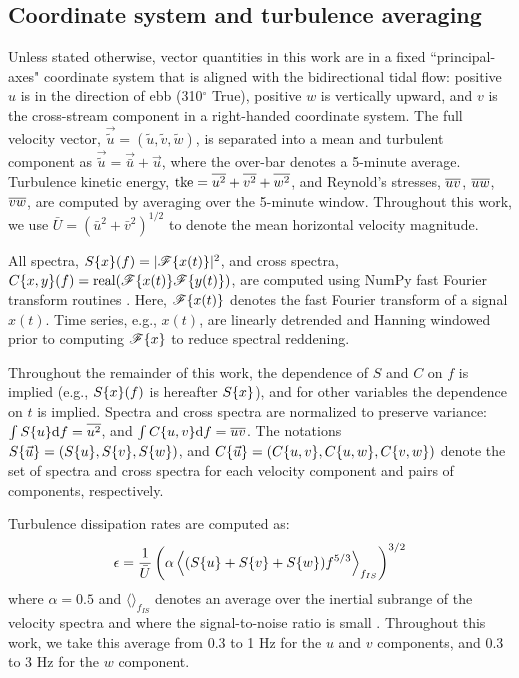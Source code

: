 \subsection{Coordinate system and turbulence averaging}

Unless stated otherwise, vector quantities in this work are in a fixed ``principal-axes" coordinate system that is aligned with the bidirectional tidal flow: positive $u$ is in the direction of ebb (310$^\circ$ True), positive $w$ is vertically upward, and $v$ is the cross-stream component in a right-handed coordinate system. The full velocity vector, $\vec{\tilde{u}} = (\tilde{u}, \tilde{v}, \tilde{w})$, is separated into a mean and turbulent component as $\vec{\tilde{u}} = \vec{\bar{u}} + \vec{u}$, where the over-bar denotes a 5-minute average. Turbulence kinetic energy, $\mathrm{tke} = \overline{u^2} + \overline{v^2}+\overline{w^2}$, and Reynold's stresses, $\overline{uv}$, $\overline{uw}$, $\overline{vw}$, are computed by averaging over the 5-minute window.  Throughout this work, we use $\bar{U} = (\bar{u}^2+\bar{v}^2)^{1/2}$ to denote the mean horizontal velocity magnitude. 

All spectra, $S\{x\}(f)=|\mathscr{F}\{x(t)\}|^2$, and cross spectra, $C\{x,y\}(f)=\mathrm{real}(\mathscr{F}\{x(t)\}\mathscr{F}\{y(t)\})$, are computed using NumPy fast Fourier transform routines \cite[]{Walt++2011}. Here, $\mathscr{F}\{x(t)\}$ denotes the fast Fourier transform of a signal $x(t)$. Time series, e.g., $x(t)$, are linearly detrended and Hanning windowed prior to computing $\mathscr{F}\{x\}$ to reduce spectral reddening.  

Throughout the remainder of this work, the dependence of $S$ and $C$ on $f$ is implied (e.g., $S\{x\}(f)$ is hereafter $S\{x\}$), and for other variables the dependence on $t$ is implied. Spectra and cross spectra are normalized to preserve variance: $\int S\{u\}\mathrm{d}f = \overline{u^2}$, and  $\int C\{u,v\}\mathrm{d}f = \overline{uv}$. The notations $S\{\vec{u}\}=(S\{u\}, S\{v\}, S\{w\})$, and $C\{\vec{u}\} = (C\{u,v\}, C\{u,w\}, C\{v,w\} )$ denote the set of spectra and cross spectra for each velocity component and pairs of components, respectively.

Turbulence dissipation rates are computed as:
\begin{align}
  \epsilon = \frac{1}{\bar{U}}\left(\alpha\left\langle(S\{u\}+S\{v\}+S\{w\})f^{5/3}\right\rangle_{f_{IS}}\right)^{3/2}
\end{align}
where  $\alpha=0.5$ and $\langle\rangle_{f_{IS}}$ denotes an average over the inertial subrange of the velocity spectra and where the signal-to-noise ratio is small \cite[]{Lumley+Terray1983,Sreenivasan1995}. Throughout this work, we take this average from 0.3 to 1 Hz for the $u$ and $v$ components, and 0.3 to 3 Hz for the $w$ component.

